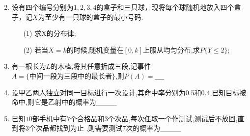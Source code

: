 \documentclass[12pt, a4paper, oneside, UTF8]{ctexbook}
\begin{document}
\begin{enumerate}
\begin{solution}
\[        \]
    \end{solution}
    \item 设有四个编号分别为$1,2,3,4$的盒子和三只球，现将每个球随机地放入四个盒子，记$X$为至少有一只球的盒子的最小号码.
    \begin{enumerate}
        \item [(1)] 求X的分布律; 
        \item [(2)] 若当$X=k$的时候,随机变量在$\left[0,k\right]$上服从均匀分布,求$P\{Y\leq 2\}$;
    \end{enumerate}
    \item 有一根长为$L$的木棒,将其任意折成三段,记事件$A=\{\text{中间一段为三段中的最长者}\}$,则$P(A)=\_\_\_\_$
    \begin{solution}
    
    \end{solution}
    \item 设甲乙两人独立对同一目标进行一次设计,其命中率分别为0.5和0.4,已知目标被命中,则它是乙射中的概率为\_\_\_\_
    \begin{solution}
        
    \end{solution}
    \item 已知$10$部手机中有$7$个合格品和$3$个次品,每次任取一个作测试,测试后不放回,直到将$3$个次品都找到为止
    ,则需要测试$7$次的概率为\_\_\_\_
    \begin{solution}
        

\end{solution}
\end{enumerate}
\end{document}

